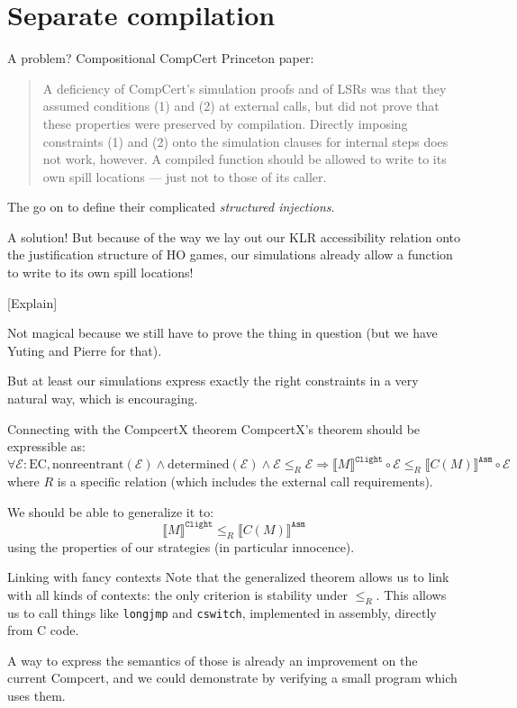 \documentclass[handout]{beamer}
\newcommand{\EC}{\text{EC}}
\newcommand{\kw}[1]{\texttt{#1}}
\newcommand{\E}{\mathcal{E}}
\begin{document}
\section{Separate compilation}

\begin{frame}{A problem?} %
Compositional CompCert Princeton paper:
\begin{quote}
A deficiency of CompCert’s simulation proofs and of LSRs
was that they assumed conditions (1) and (2) at external calls,
but did not prove that these properties were preserved by compilation.
Directly imposing constraints (1) and (2)
onto the simulation clauses for internal steps does not work, however.
A compiled function should be allowed to
write to its own spill locations ---
just not to those of its caller.
\end{quote}
The go on to define their complicated \emph{structured injections}.
\end{frame}

\begin{frame}{A solution!} %
But because of the way we lay out our KLR accessibility relation
onto the justification structure of HO games,
our simulations already allow a function
to write to its own spill locations!

[Explain]

Not magical because we still have to prove the thing in question
(but we have Yuting and Pierre for that).

But at least our simulations express exactly the right constraints
in a very natural way, which is encouraging.
\end{frame}

\begin{frame}{Connecting with the CompcertX theorem} %
CompcertX's theorem should be expressible as:
\[
  \forall \E : \EC,
    \text{nonreentrant}(\E) \wedge
    \text{determined}(\E) \wedge
    \E \le_R \E \Rightarrow
    \llbracket M \rrbracket^\kw{Clight} \circ \E \le_R
    \llbracket C(M) \rrbracket^\kw{Asm} \circ \E
\]
where $R$ is a specific relation
(which includes the external call requirements).

We should be able to generalize it to:
\[
    \llbracket M \rrbracket^\kw{Clight} \le_R
    \llbracket C(M) \rrbracket^\kw{Asm}
\]
using the properties of our strategies
(in particular innocence).
\end{frame}

\begin{frame}{Linking with fancy contexts} %
Note that the generalized theorem allows us to link with
all kinds of contexts:
the only criterion is stability under $\le_R$.
This allows us to call things like \kw{longjmp} and \kw{cswitch},
implemented in assembly,
directly from C code.

A way to express the semantics of those is already
an improvement on the current Compcert,
and we could demonstrate by verifying a small program
which uses them.
\end{frame}
\end{document}
